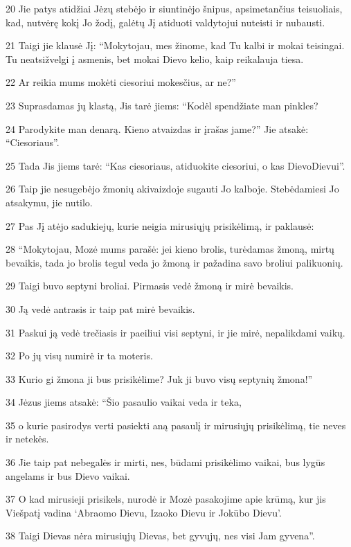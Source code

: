 \par 20 Jie patys atidžiai Jėzų stebėjo ir siuntinėjo šnipus, apsimetančius teisuoliais, kad, nutvėrę kokį Jo žodį, galėtų Jį atiduoti valdytojui nuteisti ir nubausti. 
\par 21 Taigi jie klausė Jį: “Mokytojau, mes žinome, kad Tu kalbi ir mokai teisingai. Tu neatsižvelgi į asmenis, bet mokai Dievo kelio, kaip reikalauja tiesa. 
\par 22 Ar reikia mums mokėti ciesoriui mokesčius, ar ne?” 
\par 23 Suprasdamas jų klastą, Jis tarė jiems: “Kodėl spendžiate man pinkles? 
\par 24 Parodykite man denarą. Kieno atvaizdas ir įrašas jame?” Jie atsakė: “Ciesoriaus”. 
\par 25 Tada Jis jiems tarė: “Kas ciesoriaus, atiduokite ciesoriui, o kas Dievo­Dievui”. 
\par 26 Taip jie nesugebėjo žmonių akivaizdoje sugauti Jo kalboje. Stebėdamiesi Jo atsakymu, jie nutilo. 
\par 27 Pas Jį atėjo sadukiejų, kurie neigia mirusiųjų prisikėlimą, ir paklausė: 
\par 28 “Mokytojau, Mozė mums parašė: jei kieno brolis, turėdamas žmoną, mirtų bevaikis, tada jo brolis tegul veda jo žmoną ir pažadina savo broliui palikuonių. 
\par 29 Taigi buvo septyni broliai. Pirmasis vedė žmoną ir mirė bevaikis. 
\par 30 Ją vedė antrasis ir taip pat mirė bevaikis. 
\par 31 Paskui ją vedė trečiasis ir paeiliui visi septyni, ir jie mirė, nepalikdami vaikų. 
\par 32 Po jų visų numirė ir ta moteris. 
\par 33 Kurio gi žmona ji bus prisikėlime? Juk ji buvo visų septynių žmona!” 
\par 34 Jėzus jiems atsakė: “Šio pasaulio vaikai veda ir teka, 
\par 35 o kurie pasirodys verti pasiekti aną pasaulį ir mirusiųjų prisikėlimą, tie neves ir netekės. 
\par 36 Jie taip pat nebegalės ir mirti, nes, būdami prisikėlimo vaikai, bus lygūs angelams ir bus Dievo vaikai. 
\par 37 O kad mirusieji prisikels, nurodė ir Mozė pasakojime apie krūmą, kur jis Viešpatį vadina ‘Abraomo Dievu, Izaoko Dievu ir Jokūbo Dievu’. 
\par 38 Taigi Dievas nėra mirusiųjų Dievas, bet gyvųjų, nes visi Jam gyvena”. 
